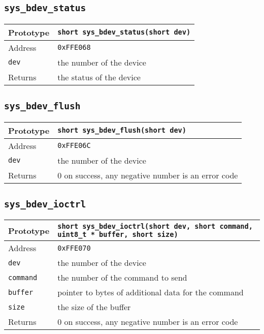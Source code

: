 \subsection*{\texttt{sys\_bdev\_status}}
\begin{tabular}{|l||l|} \hline
Prototype & \lstinline!short sys_bdev_status(short dev)! \\ \hline
Address & \texttt{0xFFE068} \\ \hline
\lstinline!dev! & the number of the device \\ \hline
Returns & the status of the device \\ \hline
\end{tabular}

\subsection*{\texttt{sys\_bdev\_flush}}
\begin{tabular}{|l||l|} \hline
Prototype & \lstinline!short sys_bdev_flush(short dev)! \\ \hline
Address & \texttt{0xFFE06C} \\ \hline
\lstinline!dev! & the number of the device \\ \hline
Returns & 0 on success, any negative number is an error code \\ \hline
\end{tabular}

\subsection*{\texttt{sys\_bdev\_ioctrl}}
\begin{tabular}{|l||l|} \hline
Prototype & \lstinline!short sys_bdev_ioctrl(short dev, short command, uint8_t * buffer, short size)! \\ \hline
Address & \texttt{0xFFE070} \\ \hline
\lstinline!dev! & the number of the device \\ \hline
\lstinline!command! & the number of the command to send \\ \hline
\lstinline!buffer! & pointer to bytes of additional data for the command \\ \hline
\lstinline!size! & the size of the buffer \\ \hline
Returns & 0 on success, any negative number is an error code \\ \hline
\end{tabular}
